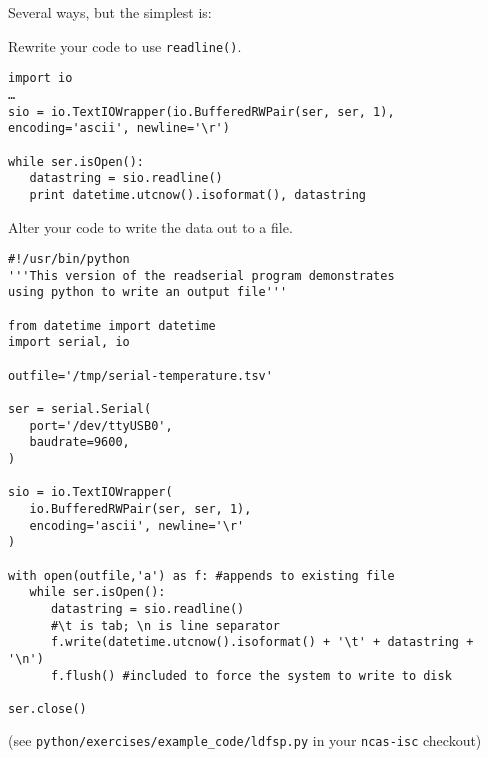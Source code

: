 \documentclass[a4paper,11pt]{article}
\begin{document}
\begin{solution}
Several ways, but the simplest is:

\noindent\usebox\serloop

\end{solution}

\begin{question}
Rewrite your code to use \texttt{readline()}.
\end{question}
\newsavebox\readlinebox
\begin{lrbox}{\readlinebox}
\begin{minipage}{\textwidth}
\begin{verbatim}
import io
…
sio = io.TextIOWrapper(io.BufferedRWPair(ser, ser, 1), encoding='ascii', newline='\r')

while ser.isOpen():
   datastring = sio.readline()
   print datetime.utcnow().isoformat(), datastring
\end{verbatim}
\end{minipage}
\end{lrbox}

\begin{solution}
\noindent\usebox\readlinebox
\end{solution}
\begin{question}
Alter your code to write the data out to a file.
\end{question}

\newsavebox\logfile
\begin{lrbox}{\logfile}
\begin{minipage}{\textwidth}
\begin{verbatim}
#!/usr/bin/python
'''This version of the readserial program demonstrates
using python to write an output file'''

from datetime import datetime
import serial, io

outfile='/tmp/serial-temperature.tsv'

ser = serial.Serial(
   port='/dev/ttyUSB0',
   baudrate=9600,
)

sio = io.TextIOWrapper(
   io.BufferedRWPair(ser, ser, 1),
   encoding='ascii', newline='\r'
)

with open(outfile,'a') as f: #appends to existing file
   while ser.isOpen():
      datastring = sio.readline()
      #\t is tab; \n is line separator
      f.write(datetime.utcnow().isoformat() + '\t' + datastring + '\n')
      f.flush() #included to force the system to write to disk

ser.close()
\end{verbatim}
\end{minipage}
\end{lrbox}
\newpage
\begin{solution}
\noindent\usebox\logfile
\par
(see \texttt{python/exercises/example\_code/ldfsp.py} in your \texttt{ncas-isc} checkout)
\end{solution}
\newpage
\printsolutions
\newpage
\end{document}
